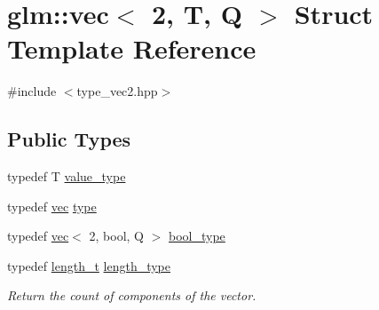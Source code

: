 \hypertarget{structglm_1_1vec_3_012_00_01_t_00_01_q_01_4}{}\section{glm\+:\+:vec$<$ 2, T, Q $>$ Struct Template Reference}
\label{structglm_1_1vec_3_012_00_01_t_00_01_q_01_4}


{\ttfamily \#include $<$type\+\_\+vec2.\+hpp$>$}

\subsection*{Public Types}
\begin{DoxyCompactItemize}
\item 
typedef T \mbox{\hyperlink{structglm_1_1vec_3_012_00_01_t_00_01_q_01_4_ab44999b08d6a5e2c26e7708ada237759}{value\+\_\+type}}
\item 
typedef \mbox{\hyperlink{structglm_1_1vec}{vec}} \mbox{\hyperlink{structglm_1_1vec_3_012_00_01_t_00_01_q_01_4_a2734b4716ffba77d4ce4cc866cb31d3f}{type}}
\item 
typedef \mbox{\hyperlink{structglm_1_1vec}{vec}}$<$ 2, bool, Q $>$ \mbox{\hyperlink{structglm_1_1vec_3_012_00_01_t_00_01_q_01_4_a69145b83aafbff09d5d187089564c46f}{bool\+\_\+type}}
\item 
typedef \mbox{\hyperlink{namespaceglm_a090a0de2260835bee80e71a702492ed9}{length\+\_\+t}} \mbox{\hyperlink{structglm_1_1vec_3_012_00_01_t_00_01_q_01_4_af8b652526ec88c8513b2a8c05bf92441}{length\+\_\+type}}
\begin{DoxyCompactList}\small\item\em Return the count of components of the vector. \end{DoxyCompactList}\end{DoxyCompactItemize}
